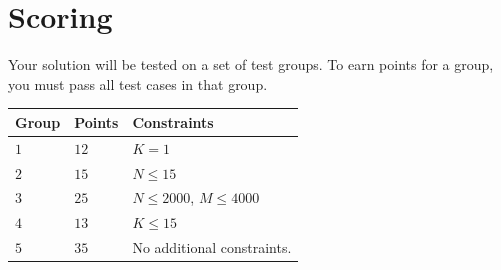 \section*{Scoring}
Your solution will be tested on a set of test groups.
To earn points for a group, you must pass all test cases in that group.

\noindent
\begin{tabular}{| l | l | l |}
  \hline
  Group & Points & Constraints \\ \hline
  $1$    & $12$        &  $K=1$ \\ \hline
  $2$    & $15$        &  $N \leq 15$ \\ \hline
  $3$    & $25$        &  $N \leq 2000$, $M \leq 4000$ \\ \hline
  $4$    & $13$        &  $K \leq 15$ \\ \hline
  $5$    & $35$       &  No additional constraints. \\ \hline
\end{tabular}
